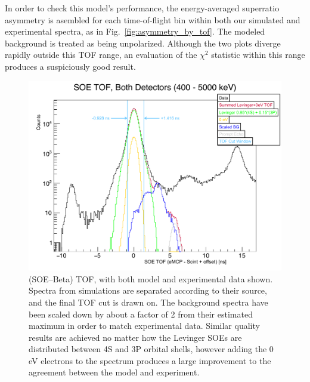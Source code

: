 In order to check this model's performance, the energy-averaged superratio asymmetry is asembled for each time-of-flight bin within both our simulated and experimental spectra, as in Fig.~\ref{fig:asymmetry_by_tof}.  The modeled background is treated as being unpolarized.  Although the two plots diverge rapidly outside this TOF range, an evaluation of the $\chi^2$ statistic within this range produces a suspiciously good result.  


\begin{figure}[h!tb]
	\centering
	\includegraphics[width=.999\linewidth]
	{Figures/SOE_TOF_Spectra.pdf}
	\caption[(SOE--Beta) TOF]{(SOE--Beta) TOF, with both model and experimental data shown.  Spectra from simulations are separated according to their source, and the final TOF cut is drawn on.  The background spectra have been scaled down by about a factor of 2 from their estimated maximum in order to match experimental data.  Similar quality results are achieved no matter how the Levinger SOEs are distributed between 4S and 3P orbital shells, however adding the 0 eV electrons to the spectrum produces a large improvement to the agreement between the model and experiment.
	}	
	\label{fig:soetof}
\end{figure}

